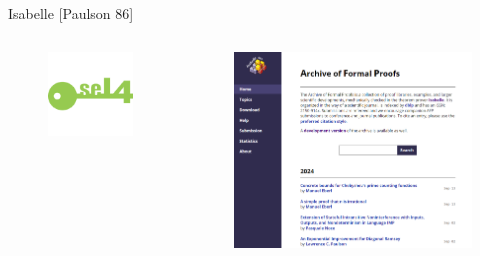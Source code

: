 \documentclass[17pt,aspectratio=169]{beamer}
\begin{document}
\begin{frame}{Isabelle {\small [Paulson 86]}}
\begin{columns}
\begin{column}{0.25\textwidth}
\begin{figure}
                \includegraphics[width=0.9\linewidth]{./images/sel4-logo.png}
            \end{figure}
        \end{column}
        \begin{column}{0.35\textwidth}
            \vspace{-20pt} 
            \begin{figure}
                \includegraphics[width=0.8\linewidth]{./images/isabelle_archive.png}
            \end{figure}
        \end{column}
    \end{columns}
\end{frame}
\end{document}
